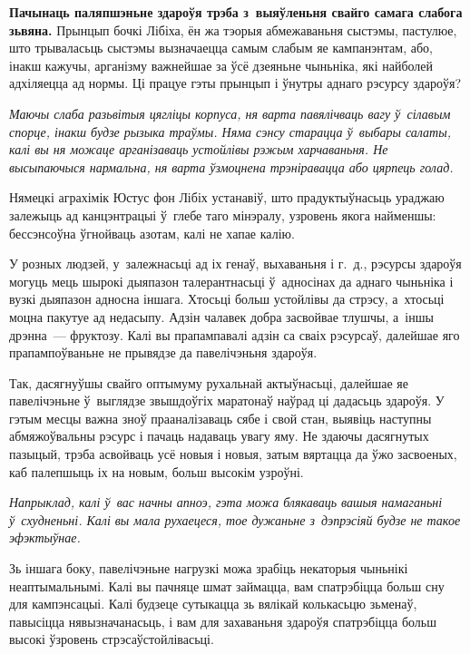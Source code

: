 \textbf{Пачынаць паляпшэньне здароўя трэба з~выяўленьня свайго самага слабога зьвяна.} Прынцып бочкі Лібіха, ён жа тэорыя абмежаваньня сыстэмы, пастулюе, што трываласьць сыстэмы вызначаецца самым слабым яе кампанэнтам, або, інакш кажучы, арганізму важнейшае за ўсё дзеяньне чыньніка, які найболей адхіляецца ад нормы. Ці працуе гэты прынцып і ўнутры аднаго рэсурсу здароўя?

\emph{Маючы слаба разьвітыя цягліцы корпуса, ня варта павялічваць вагу ў~сілавым спорце, інакш будзе рызыка траўмы. Няма сэнсу старацца ў~выбары салаты, калі вы ня можаце арганізаваць устойлівы рэжым харчаваньня. Не высыпаючыся нармальна, ня варта ўзмоцнена трэніравацца або цярпець голад.}

Нямецкі аграхімік Юстус фон Лібіх устанавіў, што прадуктыўнасьць ураджаю залежыць ад канцэнтрацыі ў~глебе таго мінэралу, узровень якога найменшы: бессэнсоўна ўгнойваць азотам, калі не хапае калію. 


У розных людзей, у~залежнасьці ад іх генаў, выхаваньня і г.~д., рэсурсы здароўя могуць мець шырокі дыяпазон талерантнасьці ў~адносінах да аднаго чыньніка і вузкі дыяпазон адносна іншага. Хтосьці больш устойлівы да стрэсу, а~хтосьці моцна пакутуе ад недасыпу. Адзін чалавек добра засвойвае тлушчы, а~іншы дрэнна~--- фруктозу. Калі вы прапампавалі адзін са сваіх рэсурсаў, далейшае яго прапампоўваньне не прывядзе да павелічэньня здароўя.

Так, дасягнуўшы свайго оптымуму рухальнай актыўнасьці, далейшае яе павелічэньне ў~выглядзе звышдоўгіх маратонаў наўрад ці дадасьць здароўя. У гэтым месцы важна зноў прааналізаваць сябе і свой стан, выявіць наступны абмяжоўвальны рэсурс і пачаць надаваць увагу яму. Не здаючы дасягнутых пазыцый, трэба асвойваць усё новыя і новыя, затым вяртацца да ўжо засвоеных, каб палепшыць іх на новым, больш высокім узроўні.


\emph{Напрыклад, калі ў~вас начны апноэ, гэта можа блякаваць вашыя намаганьні ў~схудненьні. Калі вы мала рухаецеся, тое дужаньне з~дэпрэсіяй будзе не такое эфэктыўнае.}

Зь іншага боку, павелічэньне нагрузкі можа зрабіць некаторыя чыньнікі неаптымальнымі. Калі вы пачняце шмат займацца, вам спатрэбіцца больш сну для кампэнсацыі. Калі будзеце сутыкацца зь вялікай колькасьцю зьменаў, павысіцца нявызначанасьць, і вам для захаваньня здароўя спатрэбіцца больш высокі ўзровень стрэсаўстойлівасьці.

